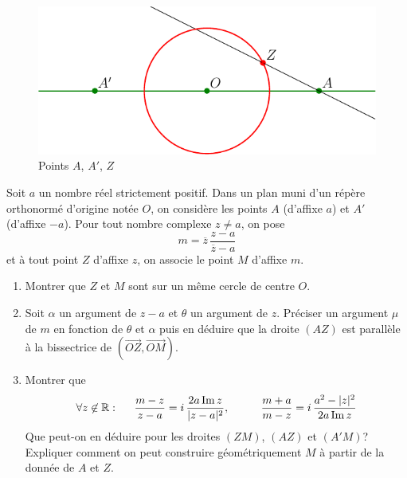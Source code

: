 
\begin{figure}[!ht]
 \centering
 \includegraphics{Ecomp8_1.pdf}
 \caption{Points $A$, $A'$, $Z$}
 \label{fig:Ecomp8_1}
\end{figure}
Soit $a$ un nombre réel strictement positif. Dans un plan muni d'un répère orthonormé d'origine notée $O$, on considère les points $A$ (d'affixe $a$) et $A'$ (d'affixe $-a$).\newline
Pour tout nombre complexe $z\neq a$, on pose
\begin{displaymath}
 m = \overline{z}\,\frac{z-a}{\overline{z}-a}
\end{displaymath}
et à tout point $Z$ d'affixe $z$, on associe le point $M$ d'affixe $m$.
\begin{enumerate}
 \item Montrer que $Z$ et $M$ sont sur un même cercle de centre $O$.
 \item Soit $\alpha$ un argument de $z-a$ et $\theta$ un argument de $z$. Préciser un argument $\mu$ de $m$ en fonction de $\theta$ et $\alpha$ puis en déduire que la droite $(AZ)$ est parallèle à la bissectrice de $(\overrightarrow{OZ},\overrightarrow{OM})$.
 \item Montrer que
\begin{displaymath}
 \forall z\not\in \mathbb{R} :\hspace{0.5cm} \frac{m-z}{z-a} = i\,\frac{2a\operatorname{Im} z}{|z-a|^2},\hspace{1cm}\frac{m+a}{m-z} = i\,\frac{a^2-|z|^2}{2a\operatorname{Im} z}
\end{displaymath}
Que peut-on en déduire pour les droites $(ZM)$, $(AZ)$ et $(A'M)$?\newline
Expliquer comment on peut construire géométriquement $M$ à partir de la donnée de $A$ et $Z$.
\end{enumerate}


